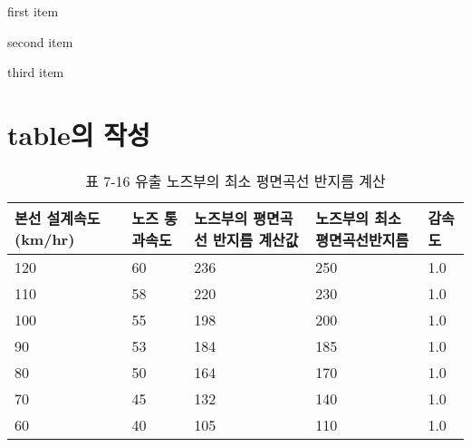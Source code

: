 \documentclass[12pt,a4paper]{report}
\begin{document}
\begin{list}{-}{body code}
\item first item
\item second item
\item third item
\end{list}





\newpage
\section{table의 작성}

		\begin{table}[htbp]
		\centering
		\caption{표 7-16 유출 노즈부의 최소 평면곡선 반지름 계산}
		\begin{tabular}{p{2cm}p{2cm}p{2cm}p{2cm}p{2cm}}
			\hline
			본선 설계속도 (km/hr) & 노즈
			통과속도 & 노즈부의 평면곡선 반지름 계산값 & 노즈부의 최소 평면곡선반지름 & 감속도 \\
			\hline
			120   & 60    & 236   & 250   & 1.0  \\
			110   & 58    & 220   & 230   & 1.0  \\
			100   & 55    & 198   & 200   & 1.0  \\
			90    & 53    & 184   & 185   & 1.0  \\
			80    & 50    & 164   & 170   & 1.0  \\
			70    & 45    & 132   & 140   & 1.0  \\
			60    & 40    & 105   & 110   & 1.0  \\
		\hline
		\end{tabular}%
		\label{tab:addlabel}%
		\end{table}%
\end{document}
